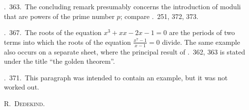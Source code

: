 \textsection.\ 363.\ The concluding remark presumably concerns the introduction of moduli that are powers of the prime number $p$; compare \textsection\textsection.\ 251, 372, 373.

\textsection.\ 367.\ The roots of the equation $x^3+xx-2x-1=0$ are the periods of two terms into which the roots of the equation $\frac{x^7-1}{x-1}=0$ divide. The same example also occurs on a separate sheet, where the principal result of \textsection\textsection.\ 362, 363 is stated under the title ``the golden theorem''.

\textsection.\ 371.\ This paragraph was intended to contain an example, but it was not worked out.
\begin{flushright}R.\ \textsc{Dedekind}.\end{flushright}
